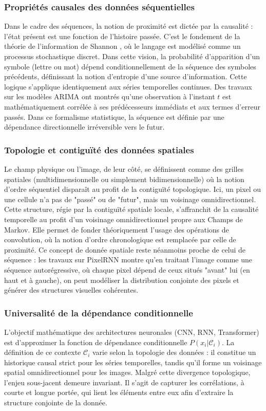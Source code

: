 \subsubsection{Propriétés causales des données séquentielles}
Dans le cadre des séquences, la notion de proximité est dictée par la causalité : l'état présent est une fonction de l'histoire passée. C'est le fondement de la théorie de l'information de Shannon \cite{shannon_mathematical_1948}, où le langage est modélisé comme un processus stochastique discret. Dans cette vision, la probabilité d'apparition d'un symbole (lettre ou mot) dépend conditionnellement de la séquence des symboles précédents, définissant la notion d'entropie d'une source d'information. Cette logique s'applique identiquement aux séries temporelles continues. Des travaux sur les modèles ARIMA \cite{box_time_2015} ont montrés qu'une observation à l'instant $t$ est mathématiquement corrélée à ses prédécesseurs immédiats et aux termes d'erreur passés. Dans ce formalisme statistique, la séquence est définie par une dépendance directionnelle irréversible vers le futur.

\subsubsection{Topologie et contiguïté des données spatiales}
Le champ physique ou l'image, de leur côté, se définissent comme des grilles spatiales (multidimensionnelle ou simplement bidimensionnelle) où la notion d'ordre séquentiel disparaît au profit de la contiguïté topologique. Ici, un pixel ou une cellule n'a pas de "passé" ou de "futur", mais un voisinage omnidirectionnel. Cette structure, régie par la contiguïté spatiale locale, s'affranchit de la causalité temporelle au profit d'un voisinage omnidirectionnel propre aux Champs de Markov. Elle permet de fonder théoriquement l'usage des opérations de convolution, où la notion d'ordre chronologique est remplacée par celle de proximité. Ce concept de donnée spatiale reste néanmoins proche de celui de séquence : les travaux sur PixelRNN \cite{van_den_oord_pixel_2016} montre qu'en traitant l'image comme une séquence autorégressive, où chaque pixel dépend de ceux situés "avant" lui (en haut et à gauche), on peut modéliser la distribution conjointe des pixels et générer des structures visuelles cohérentes.


\subsubsection{Universalité de la dépendance conditionnelle}
L'objectif mathématique des architectures neuronales (CNN, RNN, Transformer) est d'approximer la fonction de dépendance conditionnelle $P(x_i | \mathcal{C}_i)$. La définition de ce contexte $\mathcal{C}_i$ varie selon la topologie des données : il constitue un historique causal strict pour les séries temporelles, tandis qu'il forme un voisinage spatial omnidirectionnel pour les images. Malgré cette divergence topologique, l'enjeu sous-jacent demeure invariant. Il s'agit de capturer les corrélations, à courte et longue portée, qui lient les éléments entre eux afin d'extraire la structure conjointe de la donnée.

